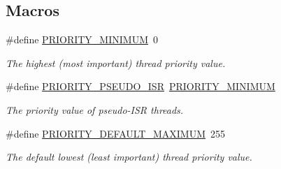 \subsection*{Macros}
\begin{DoxyCompactItemize}
\item 
\mbox{\label{group__RTEMSScorePriority_ga4e541913996f017db9428a9fe621d5d7}} 
\#define \mbox{\hyperlink{group__RTEMSScorePriority_ga4e541913996f017db9428a9fe621d5d7}{P\+R\+I\+O\+R\+I\+T\+Y\+\_\+\+M\+I\+N\+I\+M\+UM}}~0
\begin{DoxyCompactList}\small\item\em The highest (most important) thread priority value. \end{DoxyCompactList}\item 
\#define \mbox{\hyperlink{group__RTEMSScorePriority_gaa1513d851789c6be74feab5874c30ec8}{P\+R\+I\+O\+R\+I\+T\+Y\+\_\+\+P\+S\+E\+U\+D\+O\+\_\+\+I\+SR}}~\mbox{\hyperlink{group__RTEMSScorePriority_ga4e541913996f017db9428a9fe621d5d7}{P\+R\+I\+O\+R\+I\+T\+Y\+\_\+\+M\+I\+N\+I\+M\+UM}}
\begin{DoxyCompactList}\small\item\em The priority value of pseudo-\/\+I\+SR threads. \end{DoxyCompactList}\item 
\#define \mbox{\hyperlink{group__RTEMSScorePriority_ga2711e6c0b0a209b78f35ad5f76db56f3}{P\+R\+I\+O\+R\+I\+T\+Y\+\_\+\+D\+E\+F\+A\+U\+L\+T\+\_\+\+M\+A\+X\+I\+M\+UM}}~255
\begin{DoxyCompactList}\small\item\em The default lowest (least important) thread priority value. \end{DoxyCompactList}\end{DoxyCompactItemize}
